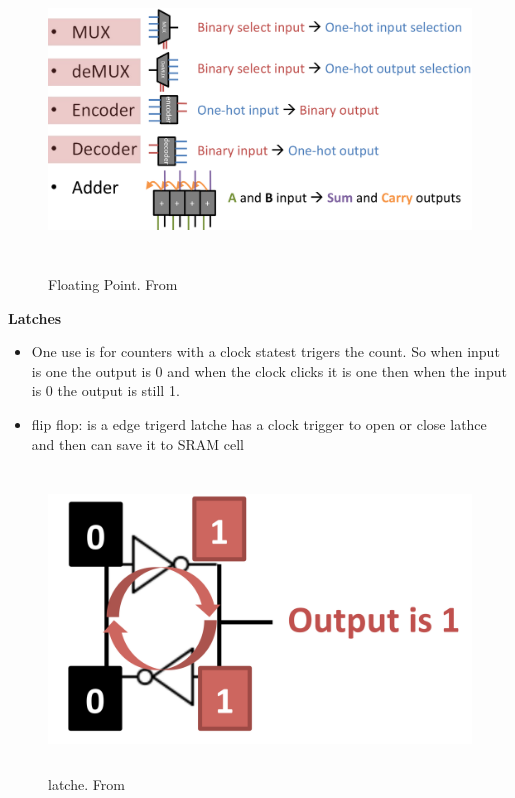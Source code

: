 \begin{figure}[h]
    \vspace{10mm}
    \centering
    \includegraphics[width=16cm, height=8cm]{image/important-logic-blocks.png} 
    \caption{Floating Point. From \cite{}}
\end{figure}

\textbf{Latches}
\begin{itemize}
\item  One use is for counters with a clock statest trigers the count.
  So when input is one the output is 0 and when the clock clicks it is one then when the input is
  0 the output is still 1.
\item flip flop: is a edge trigerd latche has a clock trigger to open or close lathce and then can save it to SRAM cell
\end{itemize}

\begin{figure}[h]
    \vspace{10mm}
    \centering
    \includegraphics[width=16cm, height=8cm]{image/latche.png} 
    \caption{latche. From \cite{}}
\end{figure}

